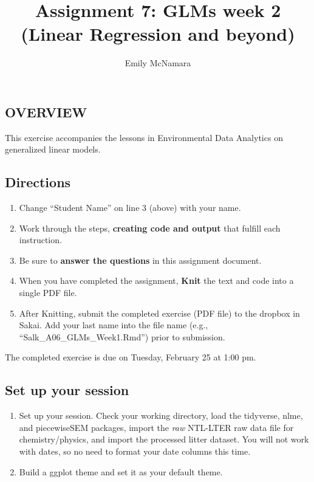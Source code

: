 \documentclass[]{article}
\title{Assignment 7: GLMs week 2 (Linear Regression and beyond)}
\author{Emily McNamara}
\date{}
\providecommand{\tightlist}{%
  \setlength{\itemsep}{0pt}\setlength{\parskip}{0pt}}
\begin{document}
\maketitle

\subsection{OVERVIEW}\label{overview}

This exercise accompanies the lessons in Environmental Data Analytics on
generalized linear models.

\subsection{Directions}\label{directions}

\begin{enumerate}
\def\labelenumi{\arabic{enumi}.}
\tightlist
\item
  Change ``Student Name'' on line 3 (above) with your name.
\item
  Work through the steps, \textbf{creating code and output} that fulfill
  each instruction.
\item
  Be sure to \textbf{answer the questions} in this assignment document.
\item
  When you have completed the assignment, \textbf{Knit} the text and
  code into a single PDF file.
\item
  After Knitting, submit the completed exercise (PDF file) to the
  dropbox in Sakai. Add your last name into the file name (e.g.,
  ``Salk\_A06\_GLMs\_Week1.Rmd'') prior to submission.
\end{enumerate}

The completed exercise is due on Tuesday, February 25 at 1:00 pm.

\subsection{Set up your session}\label{set-up-your-session}

\begin{enumerate}
\def\labelenumi{\arabic{enumi}.}
\item
  Set up your session. Check your working directory, load the tidyverse,
  nlme, and piecewiseSEM packages, import the \emph{raw} NTL-LTER raw
  data file for chemistry/physics, and import the processed litter
  dataset. You will not work with dates, so no need to format your date
  columns this time.
\item
  Build a ggplot theme and set it as your default theme.
\end{enumerate}
\end{document}
